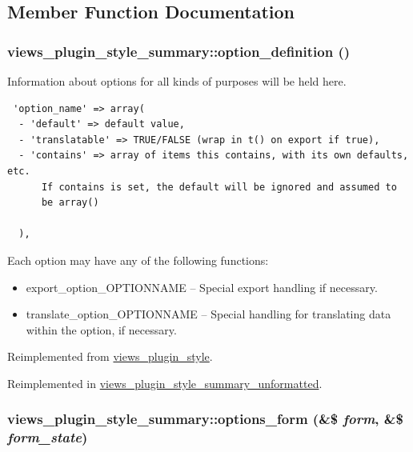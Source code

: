 \subsection{Member Function Documentation}
\hypertarget{classviews__plugin__style__summary_7b016dd1af2076e3cf3199cede83d953}{
\subsubsection[{option\_\-definition}]{\setlength{\rightskip}{0pt plus 5cm}views\_\-plugin\_\-style\_\-summary::option\_\-definition ()}}
\label{classviews__plugin__style__summary_7b016dd1af2076e3cf3199cede83d953}


Information about options for all kinds of purposes will be held here. 

\begin{Code}\begin{verbatim} 'option_name' => array(
  - 'default' => default value,
  - 'translatable' => TRUE/FALSE (wrap in t() on export if true),
  - 'contains' => array of items this contains, with its own defaults, etc.
      If contains is set, the default will be ignored and assumed to
      be array()

  ),
\end{verbatim}
\end{Code}

 Each option may have any of the following functions:\begin{itemize}
\item export\_\-option\_\-OPTIONNAME -- Special export handling if necessary.\item translate\_\-option\_\-OPTIONNAME -- Special handling for translating data within the option, if necessary. \end{itemize}


Reimplemented from \hyperlink{classviews__plugin__style_95b6f2eadf403ff36f1ff2860294b3c2}{views\_\-plugin\_\-style}.

Reimplemented in \hyperlink{classviews__plugin__style__summary__unformatted_3bc8b50051e4681461dedb8099f54c24}{views\_\-plugin\_\-style\_\-summary\_\-unformatted}.\hypertarget{classviews__plugin__style__summary_43826183b4d54242ae5276f40f70475f}{
\subsubsection[{options\_\-form}]{\setlength{\rightskip}{0pt plus 5cm}views\_\-plugin\_\-style\_\-summary::options\_\-form (\&\$ {\em form}, \/  \&\$ {\em form\_\-state})}}
\label{classviews__plugin__style__summary_43826183b4d54242ae5276f40f70475f}


